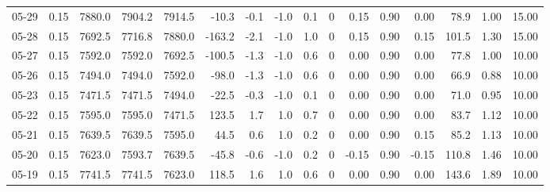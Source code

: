 \begin{threeparttable}
{\begin{tabular}{lrrrrrrrrrrrrrrr}
  05-29 &     0.15 & 7880.0 & 7904.2 & 7914.5 &      -10.3 &           -0.1 &                     -1.0 &                 0.1 &              0 &       0.15 &      0.90 &           0.00 &             78.9 &            1.00 &                  15.00 \\
  05-28 &     0.15 & 7692.5 & 7716.8 & 7880.0 &     -163.2 &           -2.1 &                     -1.0 &                 1.0 &              0 &       0.15 &      0.90 &           0.15 &            101.5 &            1.30 &                  15.00 \\
  05-27 &     0.15 & 7592.0 & 7592.0 & 7692.5 &     -100.5 &           -1.3 &                     -1.0 &                 0.6 &              0 &       0.00 &      0.90 &           0.00 &             77.8 &            1.00 &                  10.00 \\
  05-26 &     0.15 & 7494.0 & 7494.0 & 7592.0 &      -98.0 &           -1.3 &                     -1.0 &                 0.6 &              0 &       0.00 &      0.90 &           0.00 &             66.9 &            0.88 &                  10.00 \\
  05-23 &     0.15 & 7471.5 & 7471.5 & 7494.0 &      -22.5 &           -0.3 &                     -1.0 &                 0.1 &              0 &       0.00 &      0.90 &           0.00 &             71.0 &            0.95 &                  10.00 \\
  05-22 &     0.15 & 7595.0 & 7595.0 & 7471.5 &      123.5 &            1.7 &                      1.0 &                 0.7 &              0 &       0.00 &      0.90 &           0.00 &             83.7 &            1.12 &                  10.00 \\
  05-21 &     0.15 & 7639.5 & 7639.5 & 7595.0 &       44.5 &            0.6 &                      1.0 &                 0.2 &              0 &       0.00 &      0.90 &           0.15 &             85.2 &            1.13 &                  10.00 \\
  05-20 &     0.15 & 7623.0 & 7593.7 & 7639.5 &      -45.8 &           -0.6 &                     -1.0 &                 0.2 &              0 &      -0.15 &      0.90 &          -0.15 &            110.8 &            1.46 &                  10.00 \\
  05-19 &     0.15 & 7741.5 & 7741.5 & 7623.0 &      118.5 &            1.6 &                      1.0 &                 0.6 &              0 &       0.00 &      0.90 &           0.00 &            143.6 &            1.89 &                  10.00 \\

\end{tabular}}
\end{threeparttable}
